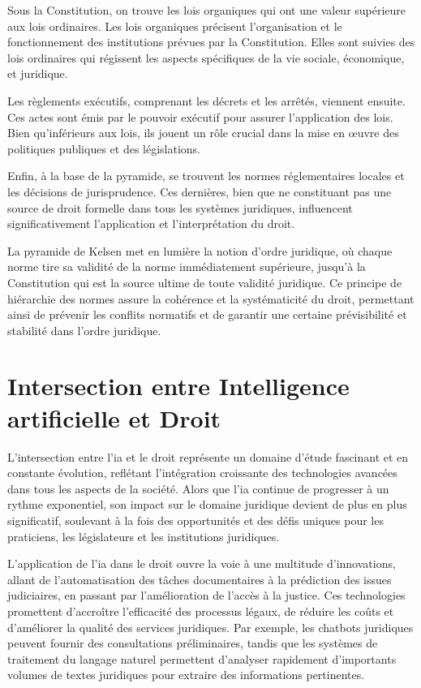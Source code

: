Sous la Constitution, on trouve les lois organiques qui ont une valeur supérieure aux lois ordinaires. Les lois organiques précisent l'organisation et le fonctionnement des institutions prévues par la Constitution. Elles sont suivies des lois ordinaires qui régissent les aspects spécifiques de la vie sociale, économique, et juridique.

Les règlements exécutifs, comprenant les décrets et les arrêtés, viennent ensuite. Ces actes sont émis par le pouvoir exécutif pour assurer l'application des lois. Bien qu'inférieurs aux lois, ils jouent un rôle crucial dans la mise en œuvre des politiques publiques et des législations.

Enfin, à la base de la pyramide, se trouvent les normes réglementaires locales et les décisions de jurisprudence. Ces dernières, bien que ne constituant pas une source de droit formelle dans tous les systèmes juridiques, influencent significativement l'application et l'interprétation du droit.

La pyramide de Kelsen met en lumière la notion d'ordre juridique, où chaque norme tire sa validité de la norme immédiatement supérieure, jusqu'à la Constitution qui est la source ultime de toute validité juridique. Ce principe de hiérarchie des normes assure la cohérence et la systématicité du droit, permettant ainsi de prévenir les conflits normatifs et de garantir une certaine prévisibilité et stabilité dans l'ordre juridique.

\newpage
\section{Intersection entre Intelligence artificielle et Droit}

L'intersection entre l'\acf{ia} et le droit représente un domaine d'étude fascinant et en constante évolution, reflétant l'intégration croissante des technologies avancées dans tous les aspects de la société. Alors que l'\ac{ia} continue de progresser à un rythme exponentiel, son impact sur le domaine juridique devient de plus en plus significatif, soulevant à la fois des opportunités et des défis uniques pour les praticiens, les législateurs et les institutions juridiques.

L'application de l'\ac{ia} dans le droit ouvre la voie à une multitude d'innovations, allant de l'automatisation des tâches documentaires à la prédiction des issues judiciaires, en passant par l'amélioration de l'accès à la justice. Ces technologies promettent d'accroître l'efficacité des processus légaux, de réduire les coûts et d'améliorer la qualité des services juridiques. Par exemple, les chatbots juridiques peuvent fournir des consultations préliminaires, tandis que les systèmes de traitement du langage naturel permettent d'analyser rapidement d'importants volumes de textes juridiques pour extraire des informations pertinentes.

